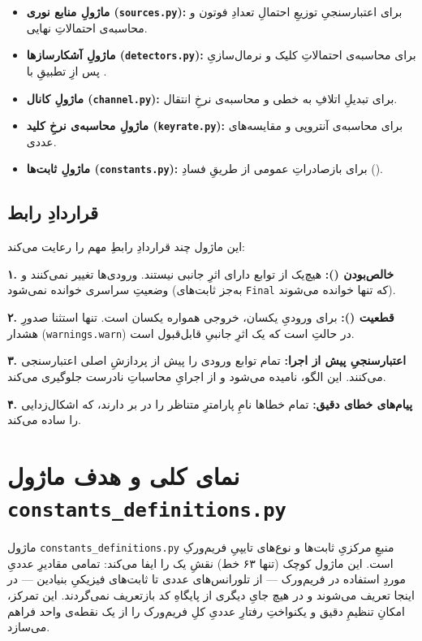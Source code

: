 \begin{itemize}
	\item \textbf{ماژولِ منابع نوری (\texttt{sources.py}):} برای اعتبارسنجیِ توزیعِ احتمالِ تعدادِ فوتون و محاسبه‌ی احتمالاتِ نهایی.
	\item \textbf{ماژولِ آشکارسازها (\texttt{detectors.py}):} برای محاسبه‌ی احتمالاتِ کلیک و نرمال‌سازیِ پس ازِ تطبیقِ با .
	\item \textbf{ماژولِ کانال (\texttt{channel.py}):} برای تبدیلِ اتلافِ  به خطی و محاسبه‌ی نرخِ انتقال.
	\item \textbf{ماژولِ محاسبه‌ی نرخِ کلید (\texttt{keyrate.py}):} برای محاسبه‌ی آنتروپی و مقایسه‌های عددی.
	\item \textbf{ماژولِ ثابت‌ها (\texttt{constants.py}):} برای بازصادراتِ عمومی از طریقِ فسادِ ().
\end{itemize}

\subsection{قراردادِ رابط}

این ماژول چند قراردادِ رابطِ مهم را رعایت می‌کند:

\textbf{۱. خالص‌بودن ():} هیچ‌یک از توابع دارای اثرِ جانبی نیستند. ورودی‌ها تغییر نمی‌کنند و وضعیتِ سراسری خوانده نمی‌شود (به‌جز ثابت‌های \texttt{Final} که تنها خوانده می‌شوند).

\textbf{۲. قطعیت ():} برای ورودیِ یکسان، خروجی همواره یکسان است. تنها استثنا صدورِ هشدار (\texttt{warnings.warn}) در حالتِ  است که یک اثرِ جانبیِ قابل‌قبول است.

\textbf{۳. اعتبارسنجیِ پیش از اجرا:} تمام توابع ورودی را پیش از پردازشِ اصلی اعتبارسنجی می‌کنند. این الگو،  نامیده می‌شود و از اجرایِ محاسباتِ نادرست جلوگیری می‌کند.

\textbf{۴. پیام‌های خطای دقیق:} تمام خطاها نامِ پارامترِ متناظر را در بر دارند، که اشکال‌زدایی را ساده می‌کند.


\section{نمای کلی و هدف ماژول \texttt{constants\_definitions.py}}

ماژول \texttt{constants\_definitions.py} منبعِ مرکزیِ ثابت‌ها و نوع‌های تایپیِ فریم‌ورکِ  است. این ماژول کوچک (تنها ۶۳ خط) نقشِ یک  را ایفا می‌کند: تمامی مقادیرِ عددیِ موردِ استفاده در فریم‌ورک — از تلورانس‌های عددی تا ثابت‌های فیزیکیِ بنیادین — در اینجا تعریف می‌شوند و در هیچ جایِ دیگری از پایگاهِ کد بازتعریف نمی‌گردند. این تمرکز، امکانِ تنظیمِ دقیق و یکنواختِ رفتارِ عددیِ کلِ فریم‌ورک را از یک نقطه‌ی واحد فراهم می‌سازد.

